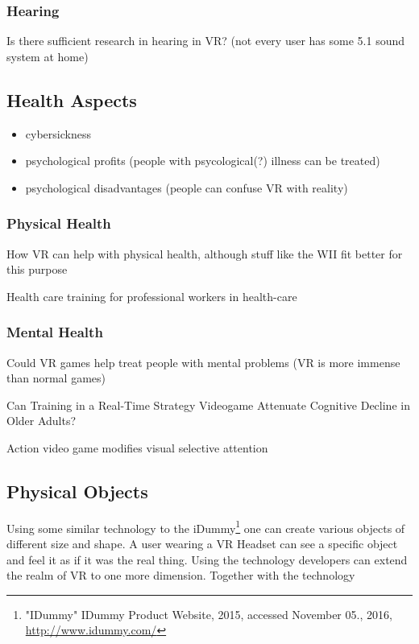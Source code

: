 \subsubsection{Hearing}
Is there sufficient research in hearing in VR? (not every user has some 5.1 sound system at home)

\subsection{Health Aspects}

\begin{itemize}
	\item cybersickness
	\item psychological profits (people with psycological(?) illness can be treated)
	\item psychological disadvantages (people can confuse VR with reality)
\end{itemize}

\subsubsection{Physical Health}
How VR can help with physical health, although stuff like the WII fit better for this purpose

Health care training for professional workers in health-care

\subsubsection{Mental Health}
Could VR games help treat people with mental problems (VR is more immense than normal games)

Can Training in a Real-Time Strategy Videogame Attenuate Cognitive Decline in Older Adults?

Action video game modifies visual selective attention

\subsection{Physical Objects}

Using some similar technology to the iDummy\footnote{"IDummy" IDummy Product Website, 2015, accessed November 05., 2016, \url{http://www.idummy.com/}} one can create various objects of different size and shape. A user wearing a VR Headset can see a specific object and feel it as if it was the real thing. Using the technology developers can extend the realm of VR to one more dimension. Together with the technology~\cite{Azmandian:2016:HRD:2858036.2858226}

